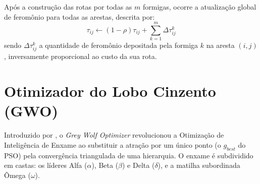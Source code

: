 \documentclass[12pt, a4paper, oneside]{report}
\begin{document}
Após a construção das rotas por todas as $m$ formigas, ocorre a atualização global de feromônio para todas as arestas, descrita por:
\begin{equation}
    \tau_{ij} \leftarrow (1 - \rho)\tau_{ij} + \sum_{k=1}^{m} \Delta\tau_{ij}^k
    \label{eq:aco_update}
\end{equation}
sendo $\Delta\tau_{ij}^k$ a quantidade de feromônio depositada pela formiga $k$ na aresta $(i,j)$, inversamente proporcional ao custo da sua rota.



\section{Otimizador do Lobo Cinzento (GWO)}
Introduzido por \citet{mirjalili2014grey}, o \textit{Grey Wolf Optimizer} revolucionou a Otimização de Inteligência de Enxame ao substituir a atração por um único ponto (o $g_{best}$ do PSO) pela convergência triangulada de uma hierarquia. O enxame é subdividido em castas: os líderes Alfa ($\alpha$), Beta ($\beta$) e Delta ($\delta$), e a matilha subordinada Ômega ($\omega$).
\end{document}
